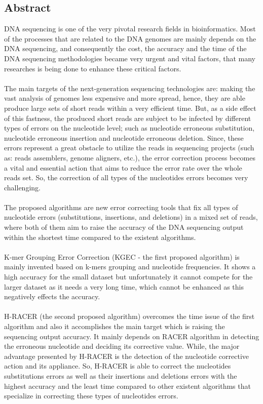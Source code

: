 \documentclass[12pt,openany]{llncs}
\begin{document}
\begin{titlepage}
\section*{Abstract}
DNA sequencing is one of the very pivotal research fields in bioinformatics. Most of the processes that are related to the DNA genomes are mainly depends on the DNA sequencing, and consequently the cost, the accuracy and the time of the DNA sequencing methodologies became very urgent and vital factors, that many researches is being done to enhance these critical factors.
\\
\\
The main targets of the next-generation sequencing technologies are: making the vast analysis of genomes less expensive and more spread, hence, they are able produce large sets of short reads within a very efficient time. But, as a side effect of this fastness, the produced short reads are subject to be infected by different types of errors on the nucleotide level; such as nucleotide erroneous substitution, nucleotide erroneous insertion and nucleotide erroneous deletion. Since, these errors represent a great obstacle to utilize the reads in sequencing projects (such as: reads assemblers, genome aligners, etc.), the error correction process becomes a vital and essential action that aims to reduce the error rate over the whole reads set. So, the correction of all types of the nucleotides errors becomes very challenging.
\\
\\ 
The proposed algorithms are new error correcting tools that fix all types of nucleotide errors (substitutions, insertions, and deletions) in a mixed set of reads, where both of them aim to raise the accuracy of the DNA sequencing output within the shortest time compared to the existent algorithms. 
\\
\\
K-mer Grouping Error Correction (KGEC - the first proposed algorithm) is mainly invented based on k-mers grouping and nucleotide frequencies. It shows a high accuracy for the small dataset but unfortunately it cannot compete for the larger dataset as it needs a very long time, which cannot be enhanced as this negatively effects the accuracy.
\\
\\
H-RACER (the second proposed algorithm) overcomes the time issue of the first algorithm and also it accomplishes the main target which is raising the sequencing output accuracy. It mainly depends on RACER algorithm in detecting the erroneous nucleotide and deciding its corrective value. While, the major advantage presented by H-RACER is the detection of the nucleotide corrective action and its appliance. So, H-RACER is able to correct the nucleotides substitutions errors as well as their insertions and deletions errors with the highest accuracy and the least time compared to other existent algorithms that specialize in correcting these types of nucleotides errors.

\end{titlepage}
\end{document}
